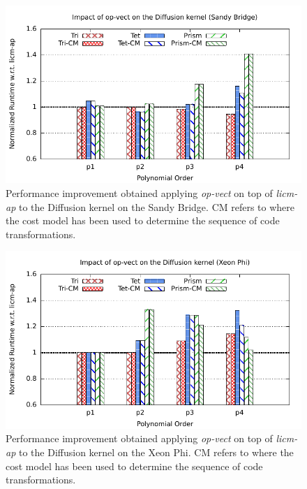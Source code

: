 \documentclass[conference]{IEEEtran}
\begin{document}
\begin{figure}[h]
\includegraphics[scale=0.7]{Pictures/diffusion-normalized-opvect.pdf}
\caption{Performance improvement obtained applying \emph{op-vect} on top of \emph{licm-ap} to the Diffusion kernel on the Sandy Bridge. CM refers to where the cost model has been used to determine the sequence of code transformations.}
\label{fig:opvect-diffusion-speedup}
\end{figure}

\begin{figure}[h]
\includegraphics[scale=0.7]{Pictures/diffusion-normalized-opvect-phi.pdf}
\caption{Performance improvement obtained applying \emph{op-vect} on top of \emph{licm-ap} to the Diffusion kernel on the Xeon Phi. CM refers to where the cost model has been used to determine the sequence of code transformations.}
\label{fig:opvect-diffusion-speedup-phi}
\end{figure}

\end{document}
